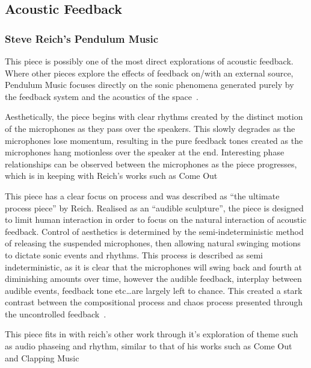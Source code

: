 \documentclass[titlepage]{scrartcl}
\begin{document}
    \subsection{Acoustic Feedback}
    \subsubsection{Steve Reich's Pendulum Music~\parencite[p.31]{reich2002wom}}\label{pendulum} 
    This piece is possibly one of the most direct explorations of acoustic
    feedback. Where other pieces explore the effects of feedback on/with an external source,
    Pendulum Music focuses directly on the sonic phenomena generated purely by
    the feedback system and the acoustics of the space~\parencite[p.50-51]{weisert2010ioi}.

    Aesthetically, the piece begins with clear rhythms created by the distinct
    motion of the microphones as they pass over the speakers. This slowly
    degrades as the microphones lose momentum, resulting in the pure feedback
    tones created as the microphones hang motionless over the speaker at the
    end. Interesting phase relationships can be observed between the
    microphones as the piece progresses, which is in keeping with Reich's works
    such as Come Out~\citeyearpar{reich1966comeout}

    This piece has a clear focus on process and was described as ``the ultimate
    process piece'' by Reich. Realised as an ``audible sculpture'', the piece is
    designed to limit human interaction in order to focus on the natural
    interaction of acoustic feedback. Control of aesthetics is determined by
    the semi-indeterministic method of releasing the suspended microphones,
    then allowing natural swinging motions to dictate sonic events and rhythms.
    This process is described as semi indeterministic, as it is clear that the
    microphones will swing back and fourth at diminishing amounts over time,
    however the audible feedback, interplay between audible events, feedback
    tone etc\ldots are largely left to chance. This created a stark contrast
    between the compositional process and chaos process presented through the
    uncontrolled feedback~\parencite[p.186]{holmes2012eaem}.

    This piece fits in with reich's other work through it's exploration of theme
    such as audio phaseing and rhythm, similar to that of his works such as Come
    Out~\citeyearpar{reich1966comeout} and Clapping Music~\citeyearpar{reich1966clap}
    
\end{document}
